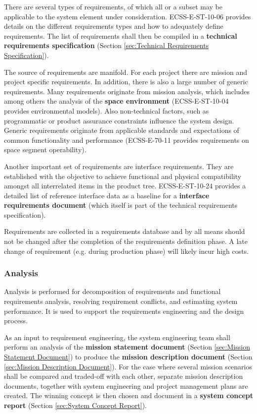 There are several types of requirements, of which all or a subset may be applicable to the system element under consideration. ECSS-E-ST-10-06 \cite{ECSS-E-ST-10-06} provides details on the different requirements types and how to adequately define requirements. The list of requirements shall then be compiled in a \textbf{technical requirements specification} (Section \ref{sec:Technical Requirements Specification}). 

The source of requirements are manifold. For each project there are mission and project specific requirements. In addition, there is also a large number of generic requirements. Many requirements originate from mission analysis, which includes among others the analysis of the \textbf{space environment} (ECSS-E-ST-10-04 \cite{ECSS-E-ST-10-04} provides environmental models). Also non-technical factors, such as programmatic or product assurance constraints influence the system design. Generic requirements originate from applicable standards and expectations of common functionality and performance (ECSS-E-70-11 \cite{ECSS-E-ST-70-11} provides requirements on space segment operability).

Another important set of requirements are interface requirements. They are established with the objective to achieve functional and physical compatibility amongst all interrelated items in the product tree. ECSS-E-ST-10-24 \cite{ECSS-E-ST-10-24} provides a detailed list of reference interface data as a baseline for a \textbf{interface requirements document} (which itself is part of the technical requirements specification). 

Requirements are collected in a requirements database and by all means should not be changed after the completion of the requirements definition phase. A late change of requirement (e.g. during production phase) will likely incur high costs.

\subsubsection{Analysis}

Analysis is performed for decomposition of requirements and functional requirements analysis, resolving requirement conflicts, and estimating system performance. It is used to support the requirements engineering and the design process.

As an input to requirement engineering, the system engineering team shall perform an analysis of the \textbf{mission statement document} (Section \ref{sec:Mission Statement Document}) to produce the \textbf{mission description document} (Section \ref{sec:Mission Description Document}). For the case where several mission scenarios shall be compared and traded-off with each other, separate mission description documents, together with system engineering and project management plans are created. The winning concept is then chosen and document in a \textbf{system concept report} (Section \ref{sec:System Concept Report}).

